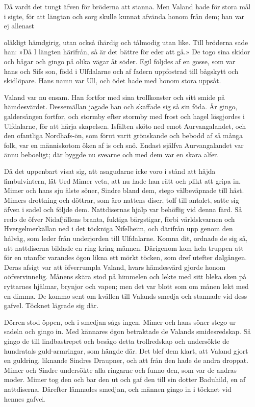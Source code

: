 Då vardt det tungt äfven för bröderna att stanna. Men Valand hade för
stora mål i sigte, för att längtan och sorg skulle kunnat afvända honom
från dem; han var ej allenast

oläkligt hämdgirig, utan också ihärdig och tålmodig utan like. Till
bröderna sade han: »Då I längten härifrån, så är det bättre för eder att
gå.» De togo sina skidor och bågar och gingo på olika vägar åt söder.
Egil följdes af en gosse, som var hans och Sifs son, född i Ulfdalarne
och af fadern uppfostrad till bågskytt och skidlöpare. Hans namn var
Ull, och ödet hade med honom stora uppsåt.

Valand var nu ensam. Han fortfor med sina trollkonster och sitt smide på
hämdesvärdet. Dessemällan jagade han och skaffade sig så sin föda. År
gingo, galdersången fortfor, och stormby efter stormby med frost och
hagel lösgjordes i Ulfdalarne, för att härja skapelsen. Isfälten sköto
ned emot Aurvangalandet, och den ofantliga Nordhafs-ön, som förut varit
grönskande och bebodd af så många folk, var en människotom öken af is
och snö. Endast själfva Aurvangalandet var ännu beboeligt; där byggde nu
svearne och med dem var en skara alfer.

Då det uppenbart visat sig, att asagudarne icke voro i stånd att häjda
fimbulvintern, lät Urd Mimer veta, att nu hade han rätt och plikt att
gripa in. Mimer och hans sju älste söner, Sindre bland dem, stego
välbeväpnade till häst. Mimers drottning och döttrar, som äro nattens
diser, tolf till antalet, satte sig äfven i sadel och följde dem.
Nattdisernas hjälp var behöflig vid denna färd. Så redo de öfver
Nidafjällens branta, fuktiga bärgstigar, förbi världskvarnen och
Hvergelmerkällan ned i det töckniga Nifelheim, och därifrån upp genom
den hålväg, som leder från underjorden till Ulfdalarne. Komna dit,
ordnade de sig så, att nattdiserna bildade en ring kring männen.
Därigenom kom hela truppen att för en utanför varandes ögon likna ett
mörkt töcken, som dref utefter dalgången. Deras afsigt var att
öfverrumpla Valand, hvars hämdesvärd gjorde honom oöfvervinnelig. Månens
skära stod på himmelen och lekte med sitt bleka sken på ryttarnes
hjälmar, brynjor och vapen; men det var blott som om månen lekt med en
dimma. De kommo sent om kvällen till Valands smedja och stannade vid
dess gafvel. Töcknet lägrade sig där.



Dörren stod öppen, och i smedjan sågs ingen. Mimer och hans söner stego
ur sadeln och gingo in. Med kännares ögon betraktade de Valands
smidesredskap. Så gingo de till lindbastrepet och besågo detta
trollredskap och undersökte de hundratals guld-armringar, som hängde
där. Det blef dem klart, att Valand gjort en guldring, liknande Sindres
Draupner, och att från den hade de andra droppat. Mimer och Sindre
undersökte alla ringarne och funno den, som var de andras moder. Mimer
tog den och bar den ut och gaf den till sin dotter Baduhild, en af
nattdiserna. Därefter lämnades smedjan, och männen gingo in i töcknet
vid hennes gafvel.

